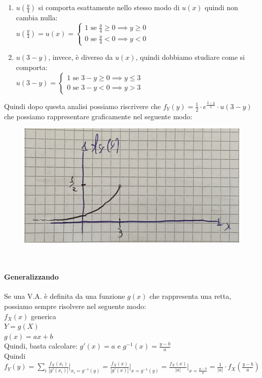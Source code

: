 \documentclass{article}
\begin{document}
\begin{enumerate}
    \item $u \left( \frac y4 \right)$ si comporta esattamente nello stesso modo di $u(x)$ quindi non cambia nulla: \\
    $u \left( \frac y4 \right) = u(x) = 
    \begin{cases} 
    1 \text{ se } \frac y4 \geq 0 \implies y \geq 0\\
    0 \text{ se } \frac y4 < 0 \implies y < 0
    \end{cases}$
    \item $u(3-y)$, invece, è diverso da $u(x)$, quindi dobbiamo studiare come si comporta: \\
    $u(3-y) = 
    \begin{cases}
    1 \text{ se } 3-y \geq 0 \implies y \leq 3 \\
    0 \text{ se } 3-y < 0 \implies y > 3
    \end{cases}$
\end{enumerate}
Quindi dopo questa analisi possiamo riscrivere che $f_Y(y) = \frac 12 \cdot e^{\frac{3-y}{2}} \cdot u \left( 3-y \right)$ che possiamo rappresentare graficamente nel seguente modo:
\begin{figure}[ht]
\centering
\includegraphics[scale=0.09]{images/59.PrimoEsCap5_3.jpeg}
\end{figure} ~\\
\paragraph{Generalizzando}
Se una V.A.  è definita da una funzione $g(x)$ che rappresenta una retta, possiamo sempre risolvere nel seguente modo: \\
$f_X(x)$ generica \\
$Y = g(X)$ \\
$g(x)= ax+b$ \\
Quindi, basta calcolare: $g'(x) = a$ e $g^{-1}(x) = \frac{y-b}{a}$ \\
Quindi $f_Y(y) = \sum_i \frac{f_X(x_i)}{|g'(x_i)|} \Big|_{x_i = g^{-1}(y)} = \frac{f_X(x)}{|g'(x)|} \Big|_{x = g^{-1}(y)} = \frac{f_X(x)}{|a|}\Big|_{x=\frac{y-b}{a}} = \frac{1}{|a|} \cdot f_X \left( \frac{y-b}{a} \right)$
\end{document}
